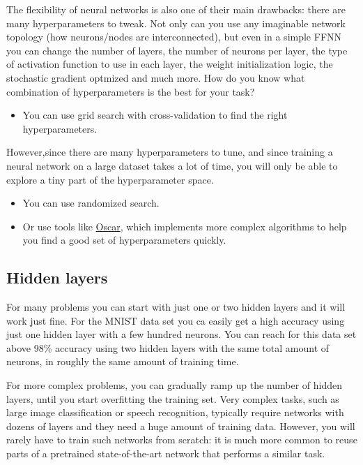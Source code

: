 \documentclass[%
oneside,                 %
final,                   %
10pt]{article}
\begin{document}
The flexibility of neural networks is also one of their main
drawbacks: there are many hyperparameters to tweak. Not only can you
use any imaginable network topology (how neurons/nodes are interconnected),
but even in a simple FFNN you can change the number of layers, the
number of neurons per layer, the type of activation function to use in
each layer, the weight initialization logic, the stochastic gradient optmized and much more. How do you
know what combination of hyperparameters is the best for your task?

\begin{itemize}
\item You can use grid search with cross-validation to find the right hyperparameters.
\end{itemize}

\noindent
However,since there are many hyperparameters to tune, and since
training a neural network on a large dataset takes a lot of time, you
will only be able to explore a tiny part of the hyperparameter space.

\begin{itemize}
\item You can use randomized search.

\item Or use tools like \href{{http://oscar.calldesk.ai/}}{Oscar}, which implements more complex algorithms to help you find a good set of hyperparameters quickly.  
\end{itemize}

\noindent
\subsection{Hidden layers}

For many problems you can start with just one or two hidden layers and it will work just fine.
For the MNIST data set you ca easily get a high accuracy using just one hidden layer with a
few hundred neurons.
You can reach for this data set above 98\% accuracy using two hidden layers with the same total amount of
neurons, in roughly the same amount of training time. 

For more complex problems, you can gradually
ramp up the number of hidden layers, until you start overfitting the training set. Very complex tasks, such
as large image classification or speech recognition, typically require networks with dozens of layers
and they need a huge amount
of training data. However, you will rarely have to train such networks from scratch: it is much more
common to reuse parts of a pretrained state-of-the-art network that performs a similar task.
\end{document}
